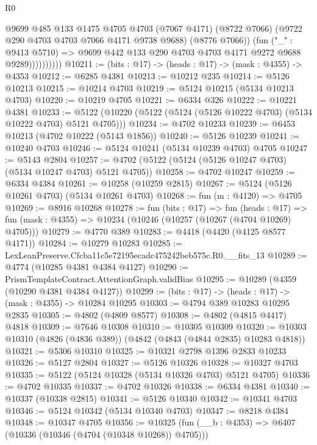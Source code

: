 \begin{lexlean}{R0}
\begin{coremodule}
                      @9699
                        @485
                        @133
                        @1475
                        @4705
                        @4703
                        (@7067 @4171)
                        (@8722 @7066)
                        (@9722 @290 @4703 @4703 @7066 @4171 @9738 @9688)
                        (@8776 @7066))
                      (fun ("_" : @9413 @5710) =>
                      @9699 @442 @133 @290 @4703 @4703 @4171 @9272 @9688 @9289))))))))))
@10211 := (bits : @17) -> (heads : @17) -> (mask : @4355) -> @4353
@10212 := @6285 @4381
@10213 := @10212 @235
@10214 := @5126 @10213
@10215 := @10214 @4703
@10219 := @5124 @10215 (@5134 @10213 @4703)
@10220 := @10219 @4705
@10221 := @6334 @326
@10222 := @10221 @4381
@10233 := @5122 (@10220 (@5122 (@5124 (@5126 @10222 @4703) (@5134 @10222 @4703) @5121 @4705)))
@10234 := @4702 @10233
@10239 := @6453 @10213 (@4702 @10222 (@5143 @1856))
@10240 := @5126 @10239
@10241 := @10240 @4703
@10246 := @5124 @10241 (@5134 @10239 @4703) @4705
@10247 := @5143 @2804
@10257 := @4702 (@5122 (@5124 (@5126 @10247 @4703) (@5134 @10247 @4703) @5121 @4705))
@10258 := @4702 @10247
@10259 := @6334 @4384
@10261 := @10258 (@10259 @2815)
@10267 := @5124 (@5126 @10261 @4703) (@5134 @10261 @4703)
@10268 := fun (m : @4120) => @4705
@10269 := @8916 @10268
@10278 := fun (bits : @17) =>
  fun (heads : @17) => fun (mask : @4355) => @10234 (@10246 (@10257 (@10267 (@4704 @10269) @4705)))
@10279 := @4770 @389
@10283 := @4418 (@4420 (@4125 @8577 @4171))
@10284 := @10279 @10283
@10285 := LexLeanPreserve.Cfcba11c5e72195ecadc475242beb575c.R0.__fits_13
@10289 := @4774 (@10285 @4381 @4384 @4127)
@10290 := PrismTemplateContract.AttentionGraph.validBias
@10295 := @10289 (@4359 (@10290 @4381 @4384 @4127))
@10299 := (bits : @17) -> (heads : @17) -> (mask : @4355) -> @10284 @10295
@10303 := @4794 @389 @10283 @10295 @2835
@10305 := @4802 (@4809 @8577)
@10308 := @4802 (@4815 @4417) @4818
@10309 := @7646 @10308
@10310 := @10305 @10309
@10320 := @10303 @10310 (@4826 (@4836 @389)) (@4842 (@4843 (@4844 @2835) @10283 @4818))
@10321 := @5306 @10310
@10325 := @10321 @2798 @1396 @2833 @10233
@10326 := @5127 @2804
@10327 := @5126 @10326
@10328 := @10327 @4703
@10335 := @5122 (@5124 @10328 (@5134 @10326 @4703) @5121 @4705)
@10336 := @4702 @10335
@10337 := @4702 @10326
@10338 := @6334 @4381
@10340 := @10337 (@10338 @2815)
@10341 := @5126 @10340
@10342 := @10341 @4703
@10346 := @5124 @10342 (@5134 @10340 @4703)
@10347 := @8218 @4384
@10348 := @10347 @4705
@10356 := @10325 (fun (__b : @4353) => @6407 (@10336 (@10346 (@4704 (@10348 @10268)) @4705)))

\end{coremodule}
\end{lexlean}
